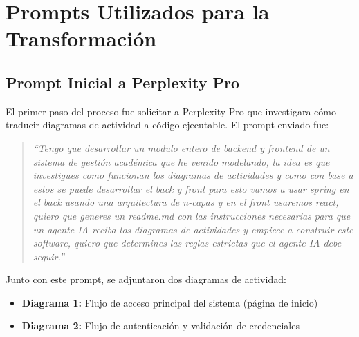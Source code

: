 \documentclass[11pt,a4paper]{article}
\begin{document}
\newpage

\section{Prompts Utilizados para la Transformación}

\subsection{Prompt Inicial a Perplexity Pro}

El primer paso del proceso fue solicitar a Perplexity Pro que investigara cómo traducir diagramas de actividad a código ejecutable. El prompt enviado fue:

\begin{quote}
\textit{``Tengo que desarrollar un modulo entero de backend y frontend de un sistema de gestión académica que he venido modelando, la idea es que investigues como funcionan los diagramas de actividades y como con base a estos se puede desarrollar el back y front para esto vamos a usar spring en el back usando una arquitectura de n-capas y en el front usaremos react, quiero que generes un readme.md con las instrucciones necesarias para que un agente IA reciba los diagramas de actividades y empiece a construir este software, quiero que determines las reglas estrictas que el agente IA debe seguir.''}
\end{quote}

Junto con este prompt, se adjuntaron dos diagramas de actividad:

\begin{itemize}
    \item \textbf{Diagrama 1:} Flujo de acceso principal del sistema (página de inicio)
    \item \textbf{Diagrama 2:} Flujo de autenticación y validación de credenciales
\end{itemize}


\end{document}

